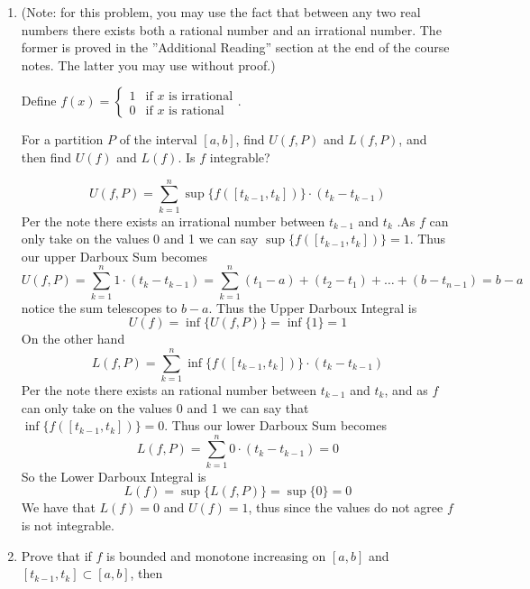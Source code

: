 \documentclass[11pt]{exam}
\newcommand{\sntk}{\sum_{k=1}^{n}}
\begin{document}
    \begin{enumerate}
        \item (Note: for this problem, you may use the fact that between any two real numbers there exists both a rational number and an irrational number. The former is proved in the ”Additional Reading” section at the end of the course notes. The latter you may use without proof.)

        Define \( f(x) = \begin{cases} 1 & \text{if } x \text{ is irrational} \\ 0 & \text{if } x \text{ is rational} \end{cases} \).
        
        For a partition \( P \) of the interval \( [a, b] \), find \( U(f, P) \) and \( L(f, P) \), and then find \( U(f) \) and \( L(f) \). Is \( f \) integrable?
        
            \begin{solution}
                $$U(f,P) = \sntk \sup\{f([t_{k-1}, t_k])\} \cdot (t_k - t_{k-1})$$
                Per the note there exists an irrational number between $t_{k-1}$ and $t_k$
                .As $f$ can only take on the values 0 and 1 we can say $\sup\{f([t_{k-1}, t_k])\} = 1$. Thus our upper Darboux Sum becomes 
                $$U(f,P) = \sntk 1 \cdot (t_k - t_{k-1}) = \sntk (t_1 - a) + (t_2 - t_1) + \ldots + (b - t_{n-1}) = b-a$$
                notice the sum telescopes to $b-a$. Thus the Upper Darboux Integral is 
                $$U(f) = \inf\{U(f, P)\} = \inf\{1\} = 1$$
                On the other hand 
                $$L(f,P) = \sntk \inf\{f([t_{k-1}, t_k])\} \cdot (t_k - t_{k-1})$$
                Per the note there exists an rational number between $t_{k-1}$ and $t_k$, and as $f$ can only take on the values 0 and 1 we can say that $\inf\{f([t_{k-1}, t_k])\} = 0$. Thus our lower Darboux Sum becomes 
                $$L(f,P) = \sntk 0 \cdot (t_k - t_{k-1}) = 0$$
                So the Lower Darboux Integral is 
                $$L(f) = \sup\{L(f, P)\} = \sup\{0\} = 0$$
                We have that $L(f) = 0$ and $U(f) = 1$, thus since the values do not agree $f$ is not integrable.
            \end{solution}
            \break
        \item Prove that if \( f \) is bounded and monotone increasing on \( [a, b] \) and \( [t_{k-1}, t_k] \subset [a, b] \), then


\end{enumerate}
\end{document}
